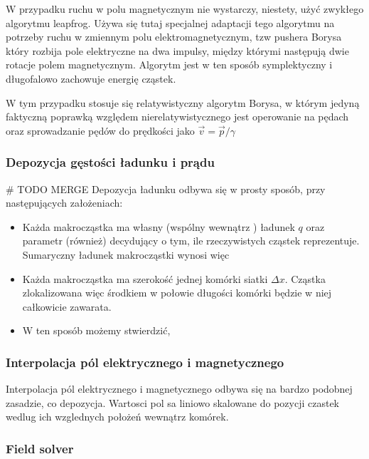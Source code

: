     W przypadku ruchu w polu magnetycznym nie wystarczy, niestety, użyć zwykłego algorytmu leapfrog. %
    Używa się tutaj specjalnej adaptacji tego algorytmu na potrzeby ruchu w zmiennym polu elektromagnetycznym,
    tzw pushera %
    Borysa %
    który rozbija pole elektryczne na dwa impulsy, między którymi następują dwie %
    rotacje polem magnetycznym. Algorytm jest w ten sposób symplektyczny %
    i długofalowo zachowuje energię cząstek.

    W tym przypadku stosuje się relatywistyczny algorytm Borysa, w którym jedyną faktyczną poprawką względem
    nierelatywistycznego jest operowanie na pędach oraz sprowadzanie pędów do prędkości jako $\vec{v} = \vec{p} / \gamma$

    \subsubsection{Depozycja gęstości ładunku i prądu} # TODO MERGE
    Depozycja ładunku odbywa się w prosty sposób, przy następujących założeniach:
    \begin{itemize}
        \item Każda makrocząstka ma własny (wspólny wewnątrz ) ładunek $q$ oraz parametr  (również) %
            decydujący o tym, ile rzeczywistych cząstek reprezentuje. Sumaryczny ładunek makrocząstki wynosi więc 
        \item Każda makrocząstka ma szerokość jednej komórki siatki $\Delta x$. Cząstka zlokalizowana więc środkiem
            w połowie długości komórki będzie w niej całkowicie zawarata.
        \item W ten sposób możemy stwierdzić, %


    \end{itemize}
    \subsubsection{Interpolacja pól elektrycznego i magnetycznego}
    Interpolacja pól elektrycznego i magnetycznego odbywa się na bardzo podobnej zasadzie, co depozycja.
    Wartosci pol sa liniowo skalowane do pozycji czastek wedlug ich wzglednych położeń wewnątrz komórek.
    \subsubsection{Field solver} %

